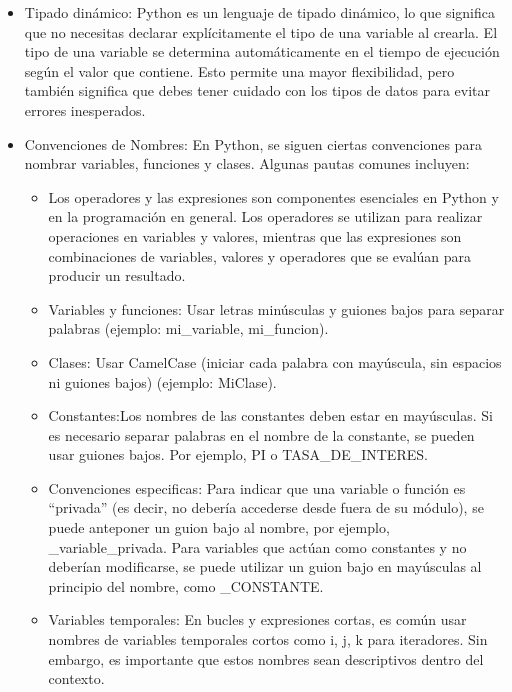 \begin{itemize}
\begin{figure}[h]
{      }
      \end{figure}
    \item Tipado dinámico: Python es un lenguaje de tipado dinámico, lo que significa que no necesitas declarar explícitamente el tipo de una variable al crearla. El tipo de una variable se determina automáticamente en el tiempo de ejecución según el valor que contiene. Esto permite una mayor flexibilidad, pero también significa que debes tener cuidado con los tipos de datos para evitar errores inesperados. 
\begin{figure}[h]
    \centering
    \end{figure}
    \item Convenciones de Nombres: En Python, se siguen ciertas convenciones para nombrar variables, funciones y clases. Algunas pautas comunes incluyen:

\begin{itemize}
    \item Los operadores y las expresiones son componentes esenciales en Python y en la programación en general. Los operadores se utilizan para realizar operaciones en variables y valores, mientras que las expresiones son combinaciones de variables, valores y operadores que se evalúan para producir un resultado. 
    \item Variables y funciones: Usar letras minúsculas y guiones bajos para separar palabras (ejemplo: mi\_variable, mi\_funcion).
    \item Clases: Usar CamelCase (iniciar cada palabra con mayúscula, sin espacios ni guiones bajos) (ejemplo: MiClase).
    \item Constantes:Los nombres de las constantes deben estar en mayúsculas. Si es necesario separar palabras en el nombre de la constante, se pueden usar guiones bajos. Por ejemplo, PI o TASA\_DE\_INTERES.
    \item Convenciones especificas: Para indicar que una variable o función es ``privada'' (es decir, no debería accederse desde fuera de su módulo), se puede anteponer un guion bajo al nombre, por ejemplo, \_variable\_privada. Para variables que actúan como constantes y no deberían modificarse, se puede utilizar un guion bajo en mayúsculas al principio del nombre, como \_CONSTANTE.
    \item Variables temporales: En bucles y expresiones cortas, es común usar nombres de variables temporales cortos como i, j, k para iteradores. Sin embargo, es importante que estos nombres sean descriptivos dentro del contexto.
\end{itemize}


\end{itemize}

